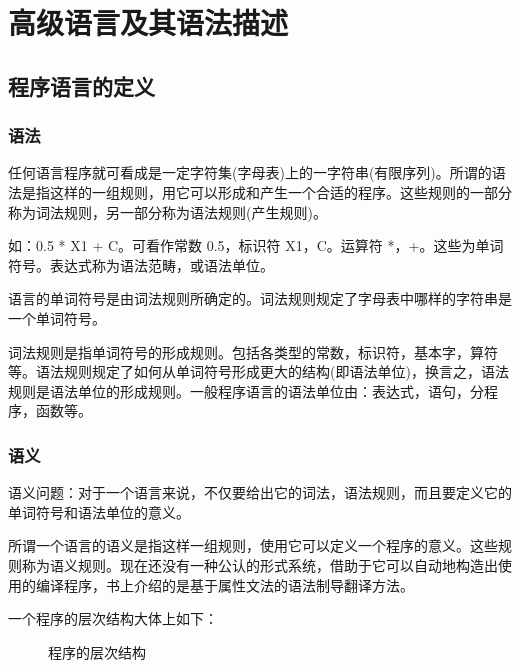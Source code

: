 \section{高级语言及其语法描述}
\subsection{程序语言的定义}
\subsubsection{语法}

任何语言程序就可看成是一定字符集(字母表)上的一字符串(有限序列)。所谓的语法是指这样的一组规则，用它可以形成和产生一个合适的程序。这些规则的一部分称为词法规则，另一部分称为语法规则(产生规则)。

如：0.5 * X1 + C。可看作常数 0.5，标识符 X1，C。运算符 *，+。这些为单词符号。表达式称为语法范畴，或语法单位。

语言的单词符号是由词法规则所确定的。词法规则规定了字母表中哪样的字符串是一个单词符号。

词法规则是指单词符号的形成规则。包括各类型的常数，标识符，基本字，算符等。语法规则规定了如何从单词符号形成更大的结构(即语法单位)，换言之，语法规则是语法单位的形成规则。一般程序语言的语法单位由：表达式，语句，分程序，函数等。

\subsubsection{语义}

语义问题：对于一个语言来说，不仅要给出它的词法，语法规则，而且要定义它的单词符号和语法单位的意义。

所谓一个语言的语义是指这样一组规则，使用它可以定义一个程序的意义。这些规则称为语义规则。现在还没有一种公认的形式系统，借助于它可以自动地构造出使用的编译程序，书上介绍的是基于属性文法的语法制导翻译方法。

一个程序的层次结构大体上如下：

\begin{figure}[H]
    \centering
    \caption{程序的层次结构}
    \label{程序的层次结构}
\end{figure}

